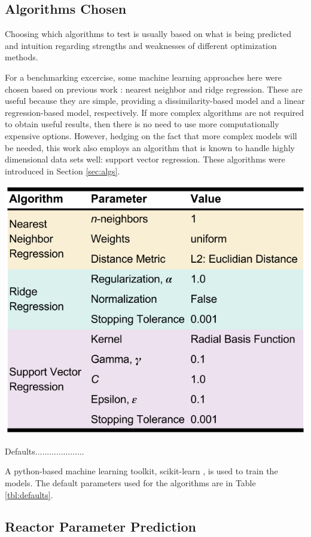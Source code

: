 \subsection{Algorithms Chosen}
\label{sec:choice}

Choosing which algorithms to test is usually based on what is being predicted
and intuition regarding strengths and weaknesses of different optimization
methods.  

For a benchmarking excercise, some machine learning approaches here were chosen
based on previous work \cite{dayman_feasibility_2013}: nearest neighbor and
ridge regression. These are useful because they are simple, providing a
dissimilarity-based model and a linear regression-based model, respectively. If
more complex algorithms are not required to obtain useful results, then there
is no need to use more computationally expensive options. However, hedging on
the fact that more complex models will be needed, this work also employs an
algorithm that is known to handle highly dimensional data sets well: support
vector regression. These algorithms were introduced in Section \ref{sec:algs}. 

\begin{table}[!htb]
  \centering
  \includegraphics[width=0.8\linewidth]{./chapters/demo_method/defaults.png}
  \caption{Defaults.....................}
  \label{tbl:defaults}
\end{table}

A python-based machine learning toolkit, scikit-learn \cite{scikit}, is used to
train the models. The default parameters used for the algorithms are in
Table \ref{tbl:defaults}.

\subsection{Reactor Parameter Prediction}
\label{sec:rxtrparam}

